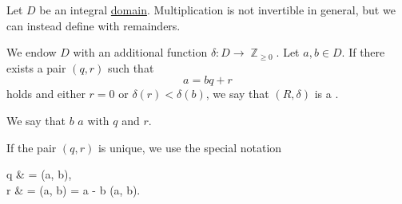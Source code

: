 \begin{definition}\label{def:euclidean_domain}
  Let \( D \) be an integral \hyperref[def:integral_domain]{domain}. Multiplication is not invertible in general, but we can instead define  with remainders.

  We endow \( D \) with an additional function \( \delta: D \to \BbbZ_{\geq 0} \). Let \( a, b \in D \). If there exists a pair \( (q, r) \) such that
  \begin{equation*}
    a = bq + r
  \end{equation*}
  holds and either \( r = 0 \) or \( \delta(r) < \delta(b) \), we say that \( (R, \delta) \) is a .

  We say that \( b \)  \( a \) with  \( q \) and  \( r \).

  If the pair \( (q, r) \) is unique, we use the special notation
  \begin{balign*}
    q & = \quot(a, b),                    \\
    r & = \rem(a, b) = a - b \quot(a, b).
  \end{balign*}
\end{definition}

